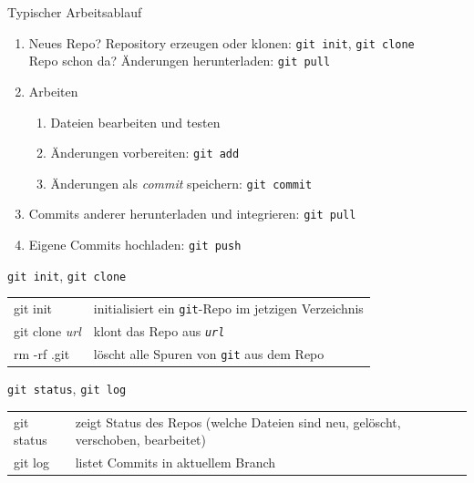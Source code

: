 \begin{frame}{Typischer Arbeitsablauf}
  \begin{enumerate}
    \item Neues Repo? Repository erzeugen oder klonen: \hfill\texttt{git init}, \texttt{git clone} \\
      Repo schon da? Änderungen herunterladen: \hfill\texttt{git pull}
    \item Arbeiten
      \begin{enumerate}
        \item Dateien bearbeiten und testen
        \item Änderungen vorbereiten: \hfill\texttt{git add}
        \item Änderungen als \emph{commit} speichern: \hfill\texttt{git commit}
      \end{enumerate}
    \item Commits anderer herunterladen und integrieren: \hfill\texttt{git pull}
    \item Eigene Commits hochladen: \hfill\texttt{git push}
  \end{enumerate}
\end{frame}

\begin{frame}{\texttt{git init}, \texttt{git clone}}
  \begin{tabu}{>{\ttfamily}l X[,L]}
    git init               & initialisiert ein \texttt{git}-Repo im jetzigen Verzeichnis \\
    git clone \textit{url} & klont das Repo aus \texttt{\textit{url}} \\
    rm -rf .git            & löscht alle Spuren von \texttt{git} aus dem Repo
  \end{tabu}
\end{frame}

\begin{frame}{\texttt{git status}, \texttt{git log}}
  \begin{tabu}{>{\ttfamily}l X[,L]}
    git status & zeigt Status des Repos (welche Dateien sind neu, gelöscht, verschoben, bearbeitet) \\
    git log    & listet Commits in aktuellem Branch
  \end{tabu}
\end{frame}


